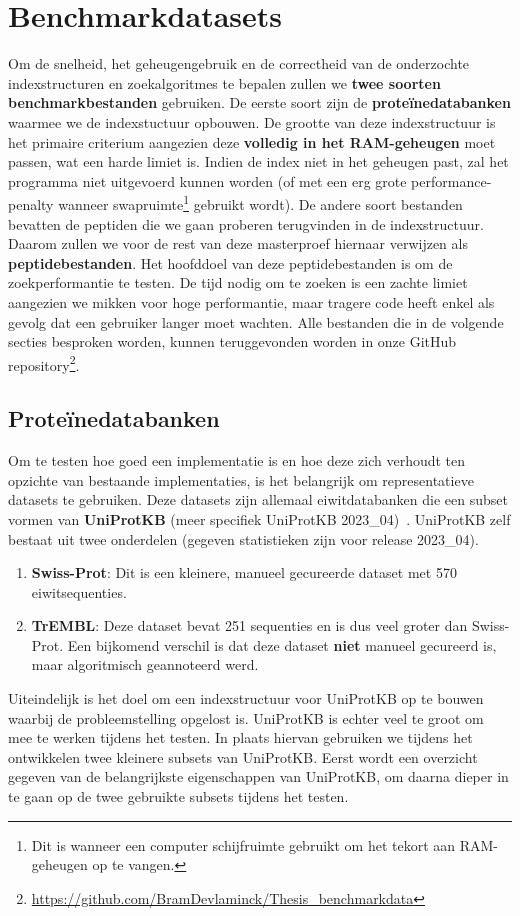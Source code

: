 \section{Benchmarkdatasets}\label{sec:datasets}
Om de snelheid, het geheugengebruik en de correctheid van de onderzochte indexstructuren en zoekalgoritmes te bepalen zullen we \textbf{twee soorten benchmarkbestanden} gebruiken.
De eerste soort zijn de \textbf{proteïnedatabanken} waarmee we de indexstuctuur opbouwen.
De grootte van deze indexstructuur is het primaire criterium aangezien deze \textbf{volledig in het RAM-geheugen} moet passen, wat een harde limiet is.
Indien de index niet in het geheugen past, zal het programma niet uitgevoerd kunnen worden (of met een erg grote performance-penalty wanneer swapruimte\footnote{Dit is wanneer een computer schijfruimte gebruikt om het tekort aan RAM-geheugen op te vangen.} gebruikt wordt).
De andere soort bestanden bevatten de peptiden die we gaan proberen terugvinden in de indexstructuur.
Daarom zullen we voor de rest van deze masterproef hiernaar verwijzen als \textbf{peptidebestanden}.
Het hoofddoel van deze peptidebestanden is om de zoekperformantie te testen.
De tijd nodig om te zoeken is een zachte limiet aangezien we mikken voor hoge performantie, maar tragere code heeft enkel als gevolg dat een gebruiker langer moet wachten.
Alle bestanden die in de volgende secties besproken worden, kunnen teruggevonden worden in onze GitHub repository\footnote{\url{https://github.com/BramDevlaminck/Thesis_benchmarkdata}}.

\subsection{Proteïnedatabanken}\label{subsec:proteine-databanken}
Om te testen hoe goed een implementatie is en hoe deze zich verhoudt ten opzichte van bestaande implementaties, is het belangrijk om representatieve datasets te gebruiken.
Deze datasets zijn allemaal eiwitdatabanken die een subset vormen van \textbf{UniProtKB} (meer specifiek UniProtKB 2023\_04)~\cite{UniprotKB}.
UniProtKB zelf bestaat uit twee onderdelen (gegeven statistieken zijn voor release 2023\_04).
\begin{enumerate}
    \item \textbf{Swiss-Prot}: Dit is een kleinere, manueel gecureerde dataset met 570 eiwitsequenties.
    \item \textbf{TrEMBL}: Deze dataset bevat 251 sequenties en is dus veel groter dan Swiss-Prot.
    Een bijkomend verschil is dat deze dataset \textbf{niet} manueel gecureerd is, maar algoritmisch geannoteerd werd.
\end{enumerate}
Uiteindelijk is het doel om een indexstructuur voor UniProtKB op te bouwen waarbij de probleemstelling opgelost is.
UniProtKB is echter veel te groot om mee te werken tijdens het testen.
In plaats hiervan gebruiken we tijdens het ontwikkelen twee kleinere subsets van UniProtKB\@.
Eerst wordt een overzicht gegeven van de belangrijkste eigenschappen van UniProtKB, om daarna dieper in te gaan op de twee gebruikte subsets tijdens het testen.

